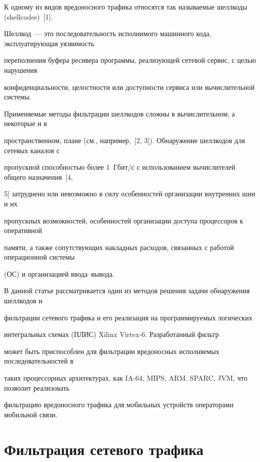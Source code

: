 К одному из видов вредоносного трафика относятся так называемые шеллкоды (shellcodes)~[1]. 


Шеллкод~--- это последовательность исполнимого машинного кода, эксплуатирующая уязвимость 


переполнения буфера ресивера программы, реализующей сетевой сервис, с целью нарушения 


конфиденциальности, целостности или доступности сервиса или вычислительной системы.





Применяемые методы фильтрации шеллкодов сложны в вычислительном, а некоторые и в


пространственном, плане (см., например,~[2, 3]). Обнаружение шеллкодов для сетевых каналов с 


пропускной способностью более 1~Гбит/с с использованием вычислителей общего назначения~[4, 


5] затруднено или невозможно в силу особенностей организации внутренних шин и их 


пропускных возможностей, особенностей организации доступа процессоров к оперативной 


памяти, а также сопутствующих накладных расходов, связанных с работой операционной системы 


(ОС) и организацией вво\-да--вы\-вода.





В данной статье рассматривается один из методов решения задачи обнаружения шеллкодов и 


фильтрации сетевого трафика и его реализация на программируемых логических


интегральных схемах (ПЛИС) Xilinx Virtex-6. Разработанный фильтр 


может быть приспособлен для фильт\-ра\-ции вредоносных исполняемых последовательностей в 


таких процессорных архитектурах, как IA-64, MIPS, ARM, SPARC, JVM, что позволит реализовать 


фильтрацию вредоносного трафика для мобильных устройств операторами мобильной связи.





\section{Фильтрация сетевого трафика}





